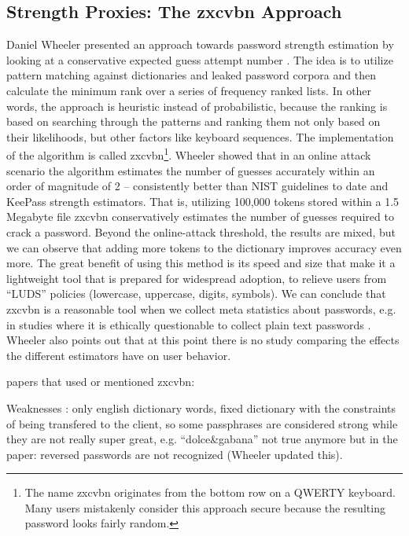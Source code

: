 	\subsection{Strength Proxies: The zxcvbn Approach}
Daniel Wheeler presented an approach towards password strength estimation by looking at a conservative expected guess attempt number \cite{Wheeler2016zxcvbn}. The idea is to utilize pattern matching against dictionaries and leaked password corpora and then calculate the minimum rank over a series of frequency ranked lists. In other words, the approach is heuristic instead of probabilistic, because the ranking is based on searching through the patterns and ranking them not only based on their likelihoods, but other factors like keyboard sequences. The implementation of the algorithm is called zxcvbn\footnote{The name zxcvbn originates from the bottom row on a QWERTY keyboard. Many users mistakenly consider this approach secure because the resulting password looks fairly random.}. Wheeler showed that in an online attack scenario \cite{Florencio2014AdministratorsGuide} the algorithm estimates the number of guesses accurately within an order of magnitude of 2 -- consistently better than NIST guidelines to date and KeePass strength estimators. That is, utilizing 100,000 tokens stored within a 1.5 Megabyte file zxcvbn conservatively estimates the number of guesses required to crack a password. Beyond the online-attack threshold, the results are mixed, but we can observe that adding more tokens to the dictionary improves accuracy even more. The great benefit of using this method is its speed and size that make it a lightweight tool that is prepared for widespread adoption, to relieve users from ``LUDS'' policies (lowercase, uppercase, digits, symbols). We can conclude that zxcvbn is a reasonable tool when we collect meta statistics about passwords, e.g. in studies where it is ethically questionable to collect plain text passwords \cite{Seitz2016SuggestionsDecoy}. Wheeler also points out that at this point there is no study comparing the effects the different estimators have on user behavior. 

papers that used or mentioned zxcvbn:
\cite{Komanduri2014Telepathwords}
\cite{Wang2016fuzzyPWM}
\cite{Ur2017DataDrivenPWMeter}
\cite{Yang2016MnemonicSentenceBased}
\cite{Gross2016CognitiveDepletion}

Weaknesses \cite{DeCarnedeCarnavalet2015PasswordMeters}: only english dictionary words, fixed dictionary with the constraints of being transfered to the client, so some passphrases are considered strong while they are not really super great, e.g. ``dolce\&gabana''
not true anymore but in the paper: reversed passwords are not recognized (Wheeler updated this). 



